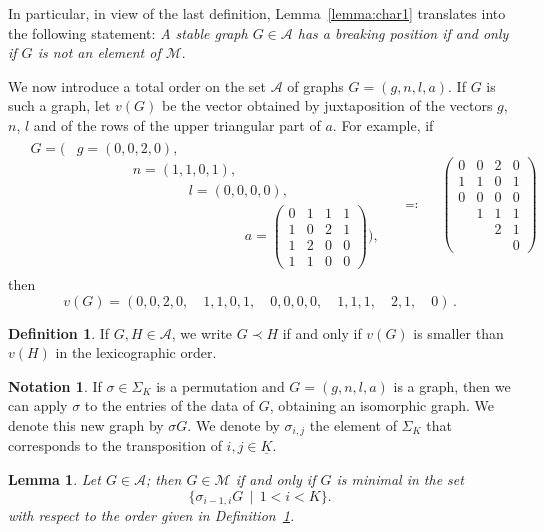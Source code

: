 \documentclass{amsart}
\theoremstyle{plain}
\newtheorem{lemma}[theorem]{Lemma}
\theoremstyle{definition}
\newtheorem{definition}[theorem]{Definition}
\newtheorem{notation}[theorem]{Notation}
\newcommand{\ubar}[1]{\underline{#1}}
\newcommand{\psm}[1]{\left(\begin{smallmatrix}#1\end{smallmatrix}\right)}
\begin{document}
In particular, in view of the last definition, Lemma~\ref{lemma:char1} translates into the following statement: \emph{A stable graph $G \in \mathcal{A}$ has a breaking position
  if and only if $G$ is not an element of $\mathcal{M}$}.

We now introduce a total order on the set $\mathcal{A}$ of graphs $G = (g,n,l,a)$. If $G$ is such a graph, let $v(G)$ be the vector obtained by
juxtaposition of the vectors $g$, $n$, $l$ and of the rows of the
upper triangular part of $a$. For example, if
\begin{align*}
  &\begin{aligned}
    G = \biggl(&g = (0,0,2,0),\\
    &\qquad \qquad n = (1,1,0,1),\\[6pt]
    &\qquad \qquad \qquad \qquad l = (0,0,0,0),\\
    &\qquad \qquad \qquad \qquad \qquad \qquad a = \psm{ 0 & 1 & 1 &
      1\\ 1 & 0 & 2 & 1\\ 1 & 2 & 0 & 0 \\ 1 & 1 & 0 & 0 }
    \biggr)\text{,}
  \end{aligned}
  && \eqqcolon &&\psm{ 0 & 0 & 2 & 0\\ 1 & 1 & 0 & 1\\ 0 & 0 & 0 & 0\\
    & 1 & 1 & 1\\ && 2 & 1\\ &&& 0 }
\end{align*}
then
\[
v(G) = (0, 0, 2, 0,\quad 1, 1, 0, 1,\quad 0, 0, 0, 0,\quad 1, 1,
1,\quad 2, 1,\quad 0)\,\text{.}
\]

\begin{definition} \label{def:order} If $G, H \in \mathcal{A}$, we
  write $G \prec H$ if and only if $v(G)$ is smaller than $v(H)$ in
  the lexicographic order.
\end{definition}

\begin{notation}
  If $\sigma \in \Sigma_K$ is a permutation and $G = (g, n, l, a)$ is
  a graph, then we can apply $\sigma$ to the entries of the data of
  $G$, obtaining an isomorphic graph. We denote this new graph by
  $\sigma G$. We denote by $\sigma_{i,j}$ the element of $\Sigma_K$ that corresponds to the transposition of $i, j \in \ubar{K}$.
\end{notation}

\begin{lemma}\label{lemma:char2}
  Let $G \in \mathcal{A}$; then $G \in \mathcal{M}$ if and only if $G$
  is minimal in the set
  \[
  \bigl\{ \sigma_{i-1,i} G \,\mid\, 1<i<K \bigr\}\text{.}
  \]
  with respect to the order given in Definition~\ref{def:order}.
\end{lemma}
\end{document}
